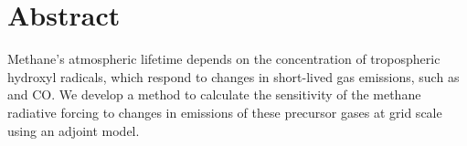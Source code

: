 \section*{Abstract}

Methane's atmospheric lifetime depends on the concentration of tropospheric hydroxyl radicals, which respond to changes in short-lived gas emissions, such as  and CO. We develop a method to calculate the sensitivity of the methane radiative forcing to changes in emissions of these precursor gases at grid scale using an adjoint model.